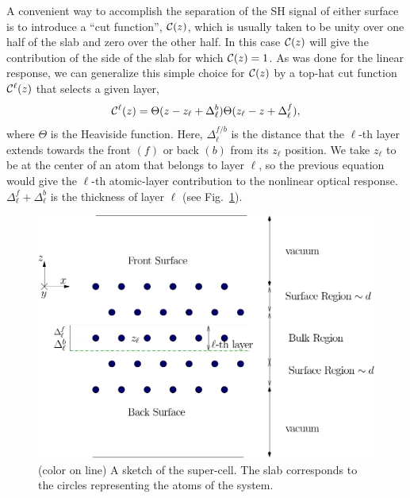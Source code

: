 \documentclass[floatfix,prb,aps,superscriptaddress,showpacs,11pt,preprint,letterpaper]{revtex4}
\begin{document}
A convenient way to accomplish the separation of the SH signal of
either surface is to introduce a ``cut function'', ${\mathbf{\cal C}}(z)$, which is 
usually taken to be unity over one half of the slab and zero over 
the other half.\cite{reiningPRB94}
In this case ${\mathbf{\cal C}}(z)$ will give the contribution of the 
side of the slab for which ${\mathbf{\cal C}}(z)=1$. 
As was done for the linear response,\cite{mendozaPRB06}
we can generalize this 
simple choice for ${\mathbf{\cal C}}(z)$ by a top-hat cut function
${\mathbf{\cal C}}^\ell(z)$ that selects a given layer,
\begin{equation}
\label{sz}
{\mathbf{\cal C}}^\ell(z)=\Theta(z-z_\ell+\Delta_\ell^{b})  
            \Theta(z_\ell-z+\Delta_\ell^f),
\end{equation} 
where $\Theta$ is the Heaviside function. Here, $\Delta_\ell^{f/b}$
is the distance that the $\ell$-th layer extends towards the front
$(f)$ or back $(b)$ from its $z_\ell$ position. 
We take $z_\ell$ to be at the center of an atom that 
belongs to layer $\ell$, so the previous
equation would give the $\ell$-th atomic-layer 
contribution to the nonlinear optical response.
$\Delta_\ell^f+\Delta_\ell^b$ is the thickness of layer $\ell$ 
(see Fig.~\ref{fslab}).
\begin{figure}
\centering
\includegraphics[scale=.7]{images/slab}
\caption{(color on line) A sketch of the super-cell. 
The slab corresponds to the
circles representing the atoms of the system.\label{fslab}} 
\end{figure}
\end{document}
